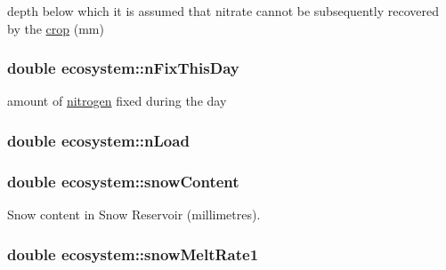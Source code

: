 depth below which it is assumed that nitrate cannot be subsequently recovered by the \hyperlink{classcrop}{crop} (mm) \hypertarget{classecosystem_a80b27b606e2c7ce413e10ea7d783469e}{
\subsubsection[{nFixThisDay}]{\setlength{\rightskip}{0pt plus 5cm}double {\bf ecosystem::nFixThisDay}}}
\label{classecosystem_a80b27b606e2c7ce413e10ea7d783469e}


amount of \hyperlink{classnitrogen}{nitrogen} fixed during the day \hypertarget{classecosystem_a2dd8b085d6e0a7d3308640fa4ab837fb}{
\subsubsection[{nLoad}]{\setlength{\rightskip}{0pt plus 5cm}double {\bf ecosystem::nLoad}}}
\label{classecosystem_a2dd8b085d6e0a7d3308640fa4ab837fb}
\hypertarget{classecosystem_a4de898c78ce48f74bd668c5a6fb0cbfe}{
\subsubsection[{snowContent}]{\setlength{\rightskip}{0pt plus 5cm}double {\bf ecosystem::snowContent}}}
\label{classecosystem_a4de898c78ce48f74bd668c5a6fb0cbfe}


Snow content in Snow Reservoir (millimetres). \hypertarget{classecosystem_a1ad645dd127e20417f1ad8e97ae75338}{
\subsubsection[{snowMeltRate1}]{\setlength{\rightskip}{0pt plus 5cm}double {\bf ecosystem::snowMeltRate1}}}
\label{classecosystem_a1ad645dd127e20417f1ad8e97ae75338}


